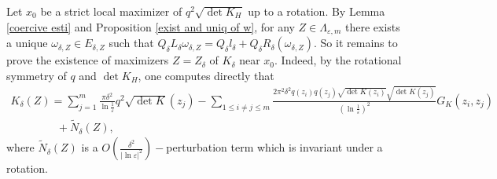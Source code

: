 \documentclass[12pt,reqno]{amsart}
\numberwithin{equation}{section}
\theoremstyle{definition}
\theoremstyle{remark}
\begin{document}
Let $ x_0  $ be a strict local maximizer of $ q^2\sqrt{\det K_H} $ up to a rotation. %
By Lemma \ref{coercive esti} and Proposition \ref{exist and uniq of w}, for any $ Z\in \Lambda_{\varepsilon, m} $ there exists a unique $ \omega_{\delta,Z}\in E_{\delta,Z} $ such that $ Q_\delta L_\delta \omega_{\delta,Z}=Q_\delta l_\delta+Q_\delta R_\delta(\omega_{\delta,Z}). $ So it remains to prove the existence of  maximizers $ Z=Z_{\delta} $ of $ K_\delta  $  near $ x_0 $.  Indeed,  by the rotational symmetry of $ q $ and  $ \det K_H $, one computes directly that
\begin{equation}\label{501}
\begin{array}{ll}
K_\delta(Z)=\sum_{j=1}^m\frac{\pi\delta^2}{\ln\frac{1}{\varepsilon}}q^2\sqrt{\det K}(z_j)-\sum_{1\leq i\neq j\leq m}\frac{2\pi^2\delta^2q(z_i)q(z_j)\sqrt{\det K(z_i)}\sqrt{\det K(z_j)}}{\left( \ln\frac{1}{\varepsilon}\right) ^2}G_K(z_i,z_j)&\\
\qquad\qquad\,+\tilde{N}_\delta(Z),&
\end{array}
\end{equation}
where $ \tilde{N}_\delta(Z) $ is a $ O\left (\frac{\delta^2}{|\ln\varepsilon|^2}\right ) -$perturbation term which is invariant under a rotation. %
\end{document}
